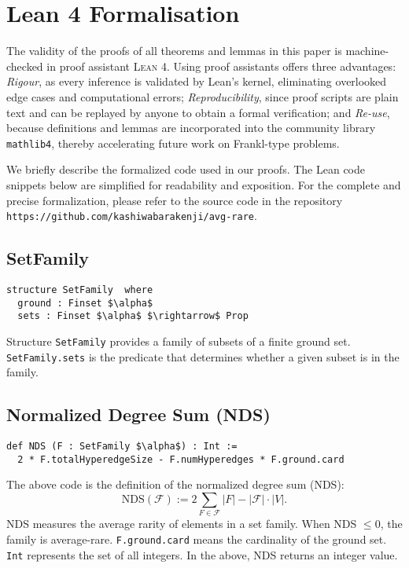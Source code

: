 \documentclass[a4paper,11pt]{article}
\begin{document}
\section*{Lean 4 Formalisation}

The validity of the proofs of all theorems and lemmas in this paper is machine-checked in
proof assistant \textsc{Lean 4}.
Using proof assistants offers three advantages:
\emph{Rigour}, as every inference is validated by Lean’s kernel, eliminating overlooked edge cases and computational errors; 
\emph{Reproducibility}, since proof scripts are plain text and can be replayed by anyone to obtain a formal verification;
 and \emph{Re-use}, because definitions and lemmas are incorporated into the community library \texttt{mathlib4}, thereby accelerating future work on Frankl-type problems.

 We briefly describe the formalized code used in our proofs. %
The Lean code snippets below are simplified for readability and exposition. For the complete and precise formalization, please refer to the source code in the repository 
\verb+https://github.com/kashiwabarakenji/avg-rare+.

\subsection*{SetFamily}
\begin{lstlisting}
structure SetFamily  where
  ground : Finset $\alpha$
  sets : Finset $\alpha$ $\rightarrow$ Prop
\end{lstlisting}

Structure \texttt{SetFamily} provides a family of subsets of a finite ground set.
\texttt{SetFamily.sets} is the predicate that determines whether a given subset is in the family.

\subsection*{Normalized Degree Sum (NDS)}
\begin{lstlisting}
def NDS (F : SetFamily $\alpha$) : Int :=
  2 * F.totalHyperedgeSize - F.numHyperedges * F.ground.card
\end{lstlisting}

The above code is the definition of the normalized degree sum (NDS):
\[
\mathrm{NDS}(\mathcal{F}) := 2 \sum_{F \in \mathcal{F}} |F| - |\mathcal{F}| \cdot |V|.
\]
NDS measures the average rarity of elements in a set family. When NDS $\le 0$, the family is average-rare.
\texttt{F.ground.card} means the cardinality of the ground set. \texttt{Int} represents the set of all integers.
In the above, NDS returns an integer value.
\end{document}
